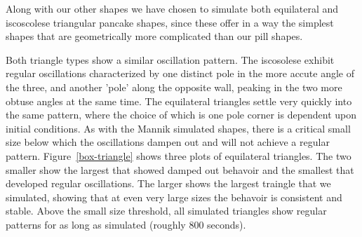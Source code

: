 \documentclass[letterpaper,twocolumn,amsmath,amssymb,pre]{revtex4-1}
\begin{document}
Along with our other shapes we have chosen to simulate both
equilateral and iscoscolese triangular pancake shapes, since these
offer in a way the simplest shapes that are geometrically more
complicated than our pill shapes.

Both triangle types show a similar oscillation pattern.  The
iscosolese exhibit regular oscillations characterized by one distinct
pole in the more accute angle of the three, and another 'pole' along
the opposite wall, peaking in the two more obtuse angles at the same
time.  The equilateral triangles settle very quickly into the same
pattern, where the choice of which is one pole corner is dependent
upon initial conditions.  As with the Mannik simulated shapes, there
is a critical small size below which the oscillations dampen out and
will not achieve a regular pattern.  Figure~\ref{box-triangle} shows
three plots of equilateral triangles.  The two smaller show the
largest that showed damped out behavoir and the smallest that
developed regular oscillations.  The larger shows the largest traingle
that we simulated, showing that at even very large sizes the behavoir
is consistent and stable.  Above the small size threshold, all
simulated triangles show regular patterns for as long as simulated
(roughly 800 seconds).


\end{document}
